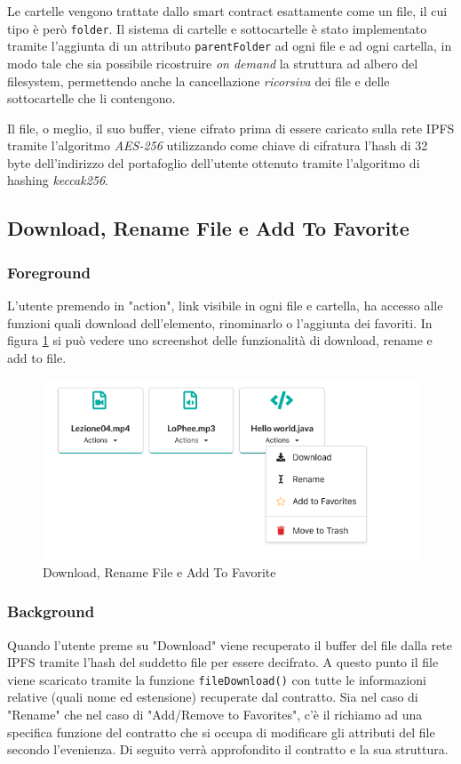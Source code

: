 \documentclass{article}
\begin{document}
Le cartelle vengono trattate dallo smart contract esattamente come un file, il cui tipo è però \texttt{folder}. Il sistema di cartelle e sottocartelle è stato implementato tramite l'aggiunta di un attributo \texttt{parentFolder} ad ogni file e ad ogni cartella, in modo tale che sia possibile ricostruire \textit{on demand} la struttura ad albero del filesystem, permettendo anche
la cancellazione \textit{ricorsiva} dei file e delle sottocartelle che li contengono.

 Il file, o meglio, il suo buffer, viene cifrato prima di essere caricato sulla rete IPFS tramite l'algoritmo \textit{AES-256} utilizzando come chiave di cifratura l'hash di 32 byte dell'indirizzo del portafoglio dell'utente ottenuto tramite l'algoritmo di hashing \textit{keccak256}.

\subsection{Download, Rename File e Add To Favorite}
\subsubsection{Foreground}
L'utente premendo in "action", link visibile in ogni file e cartella, ha accesso alle funzioni quali download dell'elemento, rinominarlo o l'aggiunta dei favoriti. In figura \ref{fig:renameFavorite} si può vedere uno screenshot delle funzionalità di download, rename e add to file.
\begin{figure}[!ht]
  \includegraphics[width=14cm]{images/renameFavorite.png}
  \centering
  \caption{Download, Rename File e Add To Favorite}
  \label{fig:renameFavorite}
\end{figure}

\subsubsection{Background}
Quando l'utente preme su "Download" viene recuperato il buffer del file dalla rete IPFS tramite l'hash del suddetto file per essere decifrato. A questo punto il file viene scaricato tramite la funzione \texttt{fileDownload()} con tutte le informazioni relative (quali nome ed estensione) recuperate dal contratto. Sia nel caso di "Rename" che nel caso di "Add/Remove to Favorites", c'è il richiamo ad una specifica funzione del contratto che si occupa di modificare gli attributi del file secondo l'evenienza. Di seguito verrà approfondito il contratto e la sua struttura.
\end{document}
